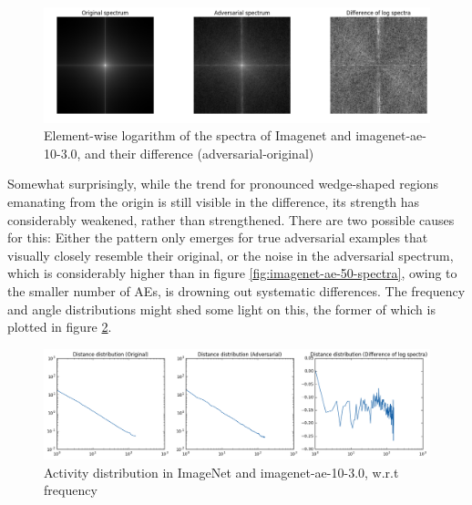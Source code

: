 \documentclass[11pt, a4paper]{article}
\begin{document}
\begin{figure}[h!tb]
	\centering
	\includegraphics[width=\textwidth]{images/spectra/imagenet-ae-10-3dot0-minconfidence-0dot9-maxorig-20000-spectra.png}
	\caption[Log spectra of ImageNet and strong adversarial examples]{Element-wise logarithm of the spectra of Imagenet and imagenet-ae-10-3.0, and their difference (adversarial-original)}
	\label{fig:imagenet-ae-10-3dot0-spectra}
\end{figure}

Somewhat surprisingly, while the trend for pronounced wedge-shaped regions emanating from the origin is still visible in the difference, its strength has considerably weakened, rather than strengthened. There are two possible causes for this: Either the pattern only emerges for true adversarial examples that visually closely resemble their original, or the noise in the adversarial spectrum, which is considerably higher than in figure \ref{fig:imagenet-ae-50-spectra}, owing to the smaller number of AEs, is drowning out systematic differences. The frequency and angle distributions might shed some light on this, the former of which is plotted in figure \ref{fig:imagenet-ae-10-3dot0-frequency}.

\begin{figure}[h!tb]
	\centering
	\includegraphics[width=\textwidth]{images/spectra/imagenet-ae-10-3dot0-minconfidence-0dot9-maxorig-20000-distance-158-bins.png}
	\caption[Log spectra of ImageNet and strong adversarial examples, frequency analysis]{Activity distribution in ImageNet and imagenet-ae-10-3.0, w.r.t frequency}
	\label{fig:imagenet-ae-10-3dot0-frequency}
\end{figure}
\end{document}
